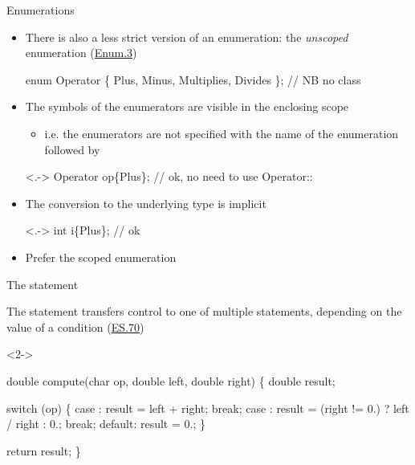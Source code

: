 \begin{frame}[fragile]{Enumerations \insertcontinuationtext}

  \begin{itemize}[<+->]
  \item There is also a less strict version of an enumeration: the
    \textit{unscoped} enumeration (\href{https://isocpp.github.io/CppCoreGuidelines/CppCoreGuidelines#enum3-prefer-class-enums-over-plain-enums}{Enum.3})
    \begin{codeblock}
enum Operator \{ Plus, Minus, Multiplies, Divides \}; // NB no class\end{codeblock}

  \item The symbols of the enumerators are visible in the enclosing scope
    \begin{itemize}[<.->]
    \item i.e. the enumerators are not specified with the name of the
      enumeration followed by \code{::}
    \end{itemize}

    \begin{codeblock}<.->
Operator op\{Plus\};  // ok, no need to use Operator::
\end{codeblock}

  \item The conversion to the underlying type is implicit
    \begin{codeblock}<.->
int i\{Plus\};  // ok\end{codeblock}

  \item Prefer the scoped enumeration

  \end{itemize}

\end{frame}

\begin{frame}[fragile]{The  statement}

  The  statement transfers control to one of multiple statements,
  depending on the value of a condition (\href{https://isocpp.github.io/CppCoreGuidelines/CppCoreGuidelines#es70-prefer-a-switch-statement-to-an-if-statement-when-there-is-a-choice}{ES.70})

  \begin{codeblock}<2->{
double compute(char op, double left, double right)
\{
  double result;

  switch (op) \{
    case \upquote{+}:
      result = left + right;
      break;
    \ddd
    case \upquote{/}:
      result = (right != 0.) ? left / right : 0.;
      break;
    default:
      result = 0.;
  \}

  return result;
\}}\end{codeblock}

\end{frame}

